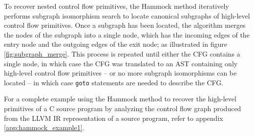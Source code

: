 To recover nested control flow primitives, the Hammock method iteratively performs subgraph isomorphism search to locate canonical subgraphs of high-level control flow primitives. Once a subgraph has been located, the algorithm merges the nodes of the subgraph into a single node, which has the incoming edges of the entry node and the outgoing edges of the exit node; as illustrated in figure \ref{fig:subgraph_merge}. This process is repeated until either the CFG contains a single node, in which case the CFG was translated to an AST containing only high-level control flow primitives -- or no more subgraph isomorphisms can be located -- in which case \texttt{goto} statements are needed to describe the CFG.

For a complete example using the Hammock method to recover the high-level primitives of a C source program by analyzing the control flow graph produced from the LLVM IR representation of a source program, refer to appendix \ref{app:hammock_example1}.



